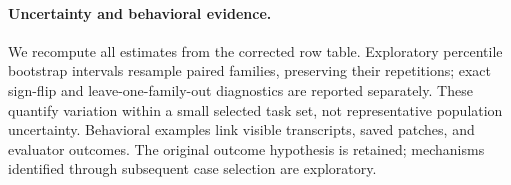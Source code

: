 \paragraph{Uncertainty and behavioral evidence.}
We recompute all estimates from the corrected row table. Exploratory percentile bootstrap intervals resample paired families, preserving their repetitions; exact sign-flip and leave-one-family-out diagnostics are reported separately. These quantify variation within a small selected task set, not representative population uncertainty. Behavioral examples link visible transcripts, saved patches, and evaluator outcomes. The original outcome hypothesis is retained; mechanisms identified through subsequent case selection are exploratory.
